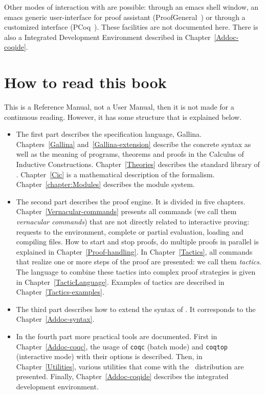 Other modes of interaction with \Coq{} are possible: through an emacs
shell window, an emacs generic user-interface for proof assistant
(ProofGeneral~\cite{ProofGeneral}) or through a customized interface
(PCoq~\cite{Pcoq}).  These facilities are not documented here.  There
is also a \Coq{} Integrated Development Environment described in
Chapter~\ref{Addoc-coqide}.

\section*{How to read this book}

This is a Reference Manual, not a User Manual, then it is not made for a
continuous reading. However, it has some structure that is explained
below.

\begin{itemize}
\item The first part describes the specification language,
  Gallina. Chapters~\ref{Gallina} and~\ref{Gallina-extension}
  describe the concrete syntax as well as the meaning of programs,
  theorems and proofs in the Calculus of Inductive
  Constructions. Chapter~\ref{Theories} describes the standard library
  of \Coq. Chapter~\ref{Cic} is a mathematical description of the
  formalism. Chapter~\ref{chapter:Modules} describes the module system.

\item The second part describes the proof engine. It is divided in
  five chapters. Chapter~\ref{Vernacular-commands} presents all
  commands (we call them \emph{vernacular commands}) that are not
  directly related to interactive proving: requests to the
  environment, complete or partial evaluation, loading and compiling
  files. How to start and stop proofs, do multiple proofs in parallel
  is explained in Chapter~\ref{Proof-handling}. In
  Chapter~\ref{Tactics}, all commands that realize one or more steps
  of the proof are presented: we call them \emph{tactics}. The
  language to combine these tactics into complex proof strategies is
  given in Chapter~\ref{TacticLanguage}. Examples of tactics are
  described in Chapter~\ref{Tactics-examples}.


\item The third part describes how to extend the syntax of \Coq. It
corresponds to the Chapter~\ref{Addoc-syntax}.

\item In the fourth part more practical tools are documented. First in
  Chapter~\ref{Addoc-coqc}, the usage of \texttt{coqc} (batch mode)
  and \texttt{coqtop} (interactive mode) with their options is
  described. Then, in Chapter~\ref{Utilities},
  various utilities that come with the \Coq\ distribution are
  presented.
  Finally, Chapter~\ref{Addoc-coqide} describes the \Coq{} integrated
  development environment. 
\end{itemize}

